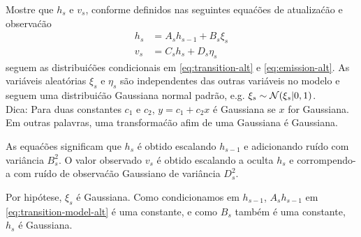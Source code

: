 \begin{exenumerate}
    
    \item Mostre que $h_s$ e $v_s$, conforme definidos nas seguintes equa\'c\~oes de atualiza\'c\~ao
    e observa\'c\~ao
    \begin{align}
        h_s & = A_s h_{s-1} + B_s \xi_s \label{eq:transition-model-alt}\\
        v_s & = C_s h_s  + D_s \eta_s \label{eq:emission-model-alt}
    \end{align}
    seguem as distribui\'c\~oes condicionais em \eqref{eq:transition-alt} e
    \eqref{eq:emission-alt}. As vari\'aveis aleat\'orias $\xi_s$ e $\eta_s$ s\~ao
    independentes das outras vari\'aveis no modelo e seguem uma
    distribui\'c\~ao Gaussiana normal padr\~ao, e.g. $\xi_s \sim \mathcal{N}(\xi_s |
    0, 1)$.\\ Dica: Para duas constantes $c_1$ e $c_2$, $y = c_1 + c_2 x$
    \'e Gaussiana se $x$ for Gaussiana. Em outras palavras, uma
    transforma\'c\~ao afim de uma Gaussiana \'e Gaussiana.
    
    As equa\'c\~oes significam que $h_s$ \'e obtido escalando $h_{s-1}$ e
    adicionando ru\'ido com vari\^ancia $B_s^2$. O valor observado $v_s$ \'e
    obtido escalando a oculta $h_s$ e corrompendo-a com
    ru\'ido de observa\'c\~ao Gaussiano de vari\^ancia $D_s^2$.
    
    \begin{solution}
        
        Por hip\'otese, $\xi_s$ \'e Gaussiana. Como condicionamos em $h_{s-1}$,
        $A_s h_{s-1}$ em \eqref{eq:transition-model-alt} \'e uma constante, e como
        $B_s$ tamb\'em \'e uma constante, $h_s$ \'e Gaussiana. 
        

\end{solution}
\end{exenumerate}
